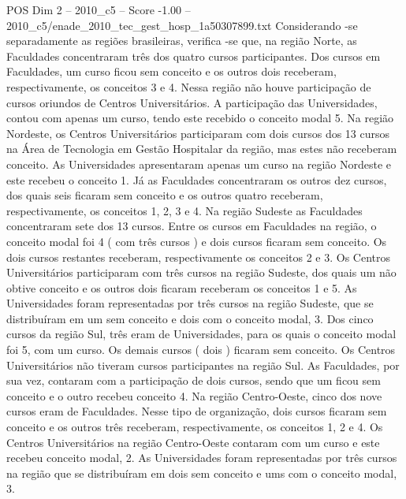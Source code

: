 \begin{textsample}{POS Dim 2 – 2010\_c5 – Score -1.00 – 2010\_c5/enade\_2010\_tec\_gest\_hosp\_1a50307899.txt}
Considerando -se separadamente as regiões brasileiras, verifica -se que, na região Norte, as Faculdades concentraram três dos quatro cursos participantes.
Dos cursos em Faculdades, um curso ficou sem conceito e os outros dois receberam, respectivamente, os conceitos 3 e 4.
Nessa região não houve participação de cursos oriundos de Centros Universitários.
A participação das Universidades, contou com apenas um curso, tendo este recebido o conceito modal 5.
Na região Nordeste, os Centros Universitários participaram com dois cursos dos 13 cursos na Área de Tecnologia em Gestão Hospitalar da região, mas estes não receberam conceito.
As Universidades apresentaram apenas um curso na região Nordeste e este recebeu o conceito 1.
Já as Faculdades concentraram os outros dez cursos, dos quais seis ficaram sem conceito e os outros quatro receberam, respectivamente, os conceitos 1, 2, 3 e 4.
Na região Sudeste as Faculdades concentraram sete dos 13 cursos.
Entre os cursos em Faculdades na região, o conceito modal foi 4 ( com três cursos ) e dois cursos ficaram sem conceito.
Os dois cursos restantes receberam, respectivamente os conceitos 2 e 3.
Os Centros Universitários participaram com três cursos na região Sudeste, dos quais um não obtive conceito e os outros dois ficaram receberam os conceitos 1 e 5.
As Universidades foram representadas por três cursos na região Sudeste, que se distribuíram em um sem conceito e dois com o conceito modal, 3.
Dos cinco cursos da região Sul, três eram de Universidades, para os quais o conceito modal foi 5, com um curso.
Os demais cursos ( dois ) ficaram sem conceito.
Os Centros Universitários não tiveram cursos participantes na região Sul.
As Faculdades, por sua vez, contaram com a participação de dois cursos, sendo que um ficou sem conceito e o outro recebeu conceito 4.
Na região Centro-Oeste, cinco dos nove cursos eram de Faculdades.
Nesse tipo de organização, dois cursos ficaram sem conceito e os outros três receberam, respectivamente, os conceitos 1, 2 e 4.
Os Centros Universitários na região Centro-Oeste contaram com um curso e este recebeu conceito modal, 2.
As Universidades foram representadas por três cursos na região que se distribuíram em dois sem conceito e ums com o conceito modal, 3.

\end{textsample}
